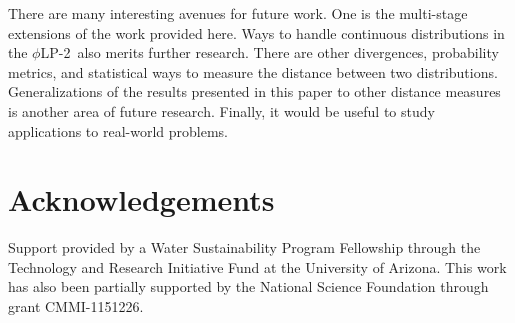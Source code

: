 \documentclass[opre,nonblindrev]{informs3} %
\newcommand{\plp}{$\phi$LP-2}
\begin{document}
There are many interesting avenues for future work. 
One is the multi-stage extensions of the work provided here. 
Ways to handle continuous distributions in the \plp\ also merits further research. 
There are other divergences, probability metrics, and statistical ways to measure the distance between two distributions. 
Generalizations of the results presented in this paper to other distance measures is another area of future research. 
Finally, it would be useful to study applications to real-world problems.



%
% 

\section*{Acknowledgements}
Support provided by a Water Sustainability Program Fellowship through the Technology and Research Initiative Fund at the University of Arizona.
This work has also been partially supported by the National Science Foundation through grant CMMI-1151226.





\end{document}
